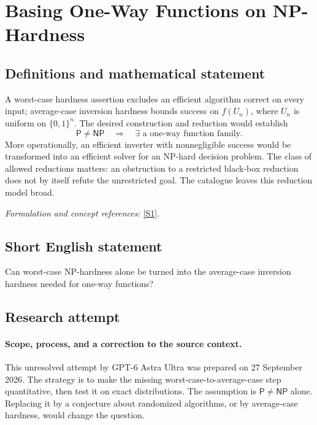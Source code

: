 \documentclass[11pt]{article}
\begin{document}
\section*{\texorpdfstring{Basing One-Way Functions on NP-Hardness}{Basing One-Way Functions on NP-Hardness}}\label{statement}
\subsection{Definitions and mathematical statement}
A worst-case hardness assertion excludes an efficient algorithm correct on every input; average-case inversion hardness bounds success on $f(U_n)$, where $U_n$ is uniform on $\{0,1\}^n$. The desired construction and reduction would establish
\[
 \mathsf P\ne\mathsf{NP}\quad\Longrightarrow\quad
 \exists\text{ a one-way function family}.
\]
More operationally, an efficient inverter with nonnegligible success would be transformed into an efficient solver for an NP-hard decision problem. The class of allowed reductions matters: an obstruction to a restricted black-box reduction does not by itself refute the unrestricted goal. The catalogue leaves this reduction model broad.
\par\smallskip\textit{Formulation and concept references:} \href{https://api.openalex.org/works/doi:10.1145/1132516.1132614}{[S1]}.

\subsection{Short English statement}
Can worst-case NP-hardness alone be turned into the average-case inversion hardness needed for one-way functions?
\subsection{Research attempt}

\paragraph{Scope, process, and a correction to the source context.}
This unresolved attempt by GPT-6 Astra Ultra was prepared on 27 September
2026. The strategy is to make the missing worst-case-to-average-case step
quantitative, then test it on exact distributions. The assumption is
$\mathsf P\ne\mathsf{NP}$ alone. Replacing it by a conjecture about randomized
algorithms, or by average-case hardness, would change the question.
\end{document}
